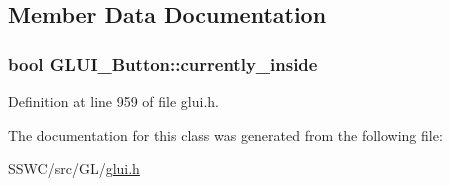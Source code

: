 \subsection{Member Data Documentation}
\hypertarget{class_g_l_u_i___button_aa7267a5e210893367862d9d96888eb41}{
\subsubsection[{currently\+\_\+inside}]{\setlength{\rightskip}{0pt plus 5cm}bool G\+L\+U\+I\+\_\+\+Button\+::currently\+\_\+inside}}\label{class_g_l_u_i___button_aa7267a5e210893367862d9d96888eb41}


Definition at line 959 of file glui.\+h.



The documentation for this class was generated from the following file\+:\begin{DoxyCompactItemize}
\item 
S\+S\+W\+C/src/\+G\+L/\hyperlink{glui_8h}{glui.\+h}\end{DoxyCompactItemize}
